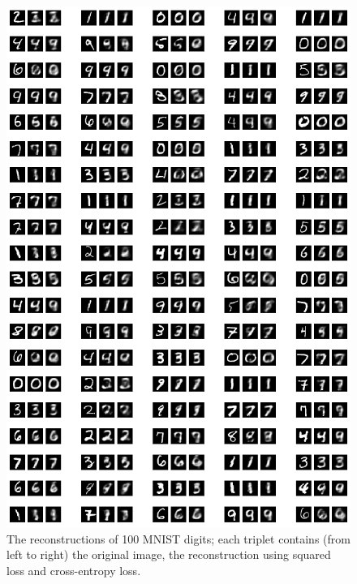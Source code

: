 \documentclass[fleqn]{article}
\begin{document}
\begin{figure}
    \centering
    \includegraphics[width=5.5in]{whole_plot.png}
    \caption{The reconstructions of 100 MNIST digits; each triplet contains (from left to right) the original image, the reconstruction using squared loss and cross-entropy loss.}
    \label{fig:mnist1}
\end{figure}
\end{document}
